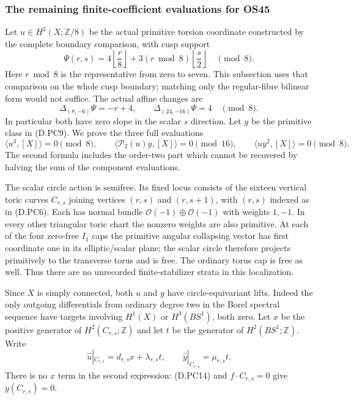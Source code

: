 \subsubsection*{The remaining finite-coefficient evaluations for OS45}
Let $u\in H^2(X;\mathbb Z/8)$ be the actual primitive torsion
coordinate constructed by the complete boundary comparison, with
cusp support
\[
 \Psi(r,s)=4\left\lfloor\frac r8\right\rfloor
       +3(r\bmod8)\left\lfloor\frac s2\right\rfloor
                           \quad\pmod8.                  \tag{D.OL1}
\]
Here $r\bmod8$ is the representative from zero to seven. This
subsection uses that comparison on the whole cusp boundary;
matching only the regular-fibre bilinear form would not suffice.
The actual affine changes are
\[
 \Delta_{(8,-6)}\Psi=-r+4,\qquad
 \Delta_{(24,-16)}\Psi=4\quad\pmod8.                     \tag{D.OL2}
\]
In particular both have zero slope in the scalar $s$ direction.
Let $y$ be the primitive class in (D.PC9).
We prove the three full evaluations
\[
 \langle u^3,[X]\rangle=0\pmod8,\qquad
 \langle\mathcal P_2(u)y,[X]\rangle=0\pmod{16},\qquad
 \langle uy^2,[X]\rangle=0\pmod8.                         \tag{D.OL3}
\]
The second formula includes the order-two part which cannot be
recovered by halving the sum of the component evaluations.

The scalar circle action is semifree. Its fixed locus consists of
the sixteen vertical toric curves $C_{r,s}$ joining vertices
$(r,s)$ and $(r,s+1)$, with $(r,s)$ indexed as in (D.PC6).
Each has normal bundle $\mathcal O(-1)\oplus\mathcal O(-1)$
with weights $1,-1$. In every other triangular toric chart the
nonzero weights are also primitive. At each of the four zero-free
$I_1$ caps the primitive angular collapsing vector has first
coordinate one in its elliptic/scalar plane; the scalar circle
therefore projects primitively to the transverse torus and is
free. The ordinary torus cap is free as well. Thus there are no
unrecorded finite-stabilizer strata in this localization.

Since $X$ is simply connected, both $u$ and $y$ have circle-equivariant
lifts. Indeed the only outgoing differentials from ordinary degree
two in the Borel spectral sequence have targets involving
$H^1(X)$ or $H^3(BS^1)$, both zero. Let $x$ be the positive
generator of $H^2(C_{r,s};\mathbb Z)$ and let $t$ be the generator
of $H^2(BS^1;\mathbb Z)$. Write
\[
 \widehat u|_{C_{r,s}}=d_{r,s}x+\lambda_{r,s}t,
 \qquad
 \widehat y|_{C_{r,s}}=\mu_{r,s}t.                         \tag{D.OL4}
\]
There is no $x$ term in the second expression: (D.PC14) and
$f\cdot C_{r,s}=0$ give $y(C_{r,s})=0$.

